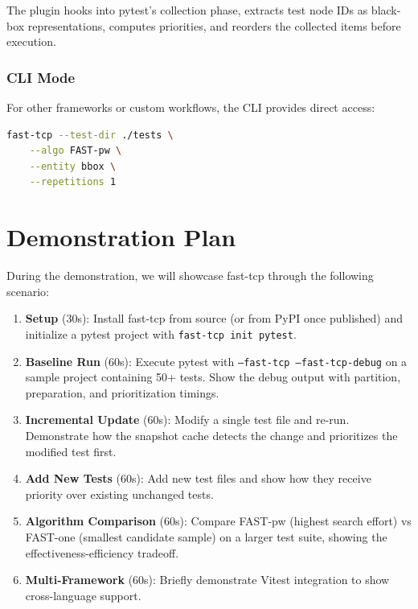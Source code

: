 \documentclass[10pt,conference]{IEEEtran}
\begin{document}
The plugin hooks into pytest's collection phase, extracts test node IDs as black-box representations, computes priorities, and reorders the collected items before execution.

\subsubsection{CLI Mode}
For other frameworks or custom workflows, the CLI provides direct access:

\begin{lstlisting}[language=bash,numbers=none]
fast-tcp --test-dir ./tests \
    --algo FAST-pw \
    --entity bbox \
    --repetitions 1
\end{lstlisting}

\section{Demonstration Plan}

During the demonstration, we will showcase fast-tcp through the following scenario:

\begin{enumerate}
    \item \textbf{Setup} (30s): Install fast-tcp from source (or from PyPI once published) and initialize a pytest project with \texttt{fast-tcp init pytest}.
    
    \item \textbf{Baseline Run} (60s): Execute pytest with \texttt{--fast-tcp --fast-tcp-debug} on a sample project containing 50+ tests. Show the debug output with partition, preparation, and prioritization timings.
    
    \item \textbf{Incremental Update} (60s): Modify a single test file and re-run. Demonstrate how the snapshot cache detects the change and prioritizes the modified test first.
    
    \item \textbf{Add New Tests} (60s): Add new test files and show how they receive priority over existing unchanged tests.
    
    \item \textbf{Algorithm Comparison} (60s): Compare FAST-pw (highest search effort) vs FAST-one (smallest candidate sample) on a larger test suite, showing the effectiveness-efficiency tradeoff.
    
    \item \textbf{Multi-Framework} (60s): Briefly demonstrate Vitest integration to show cross-language support.
\end{enumerate}
\end{document}
